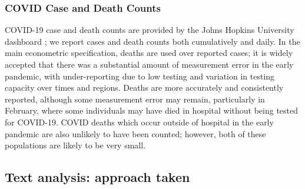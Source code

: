 \documentclass{article}
\begin{document}
\subsubsection{COVID Case and Death Counts}
COVID-19 case and death counts are provided by the Johns Hopkins University dashboard \textcite{dongInteractiveWebbasedDashboard2020}; we report cases and death counts both cumulatively and daily. In the main econometric specification, deaths are used over reported cases; it is widely accepted that there was a substantial amount of measurement error in the early pandemic, with under-reporting due to low testing and variation in testing capacity over times and regions. Deaths are more accurately and consistently reported, although some measurement error may remain, particularly in February, where some individuals may have died in hospital without being tested for COVID-19. COVID deaths which occur outside of hospital in the early pandemic are also unlikely to have been counted; however, both of these populations are likely to be very small. 

\subsection{Text analysis: approach taken}\label{approach}
\end{document}
